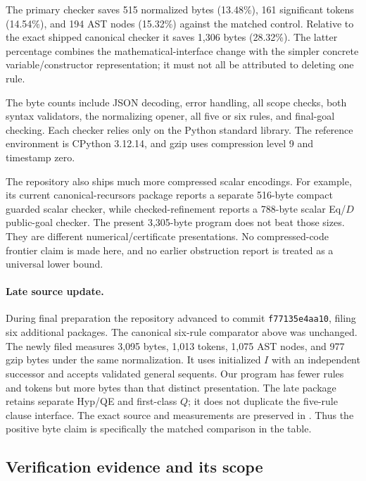

The primary checker saves 515 normalized bytes (13.48\%), 161 significant tokens (14.54\%), and 194 AST nodes (15.32\%) against the matched control. Relative to the exact shipped canonical checker it saves 1,306 bytes (28.32\%). The latter percentage combines the mathematical-interface change with the simpler concrete variable/constructor representation; it must not all be attributed to deleting one rule.

The byte counts include JSON decoding, error handling, all scope checks, both syntax validators, the normalizing opener, all five or six rules, and final-goal checking. Each checker relies only on the Python standard library. The reference environment is CPython 3.12.14, and gzip uses compression level 9 and timestamp zero.

The repository also ships much more compressed scalar encodings. For example, its current canonical-recursors package reports a separate 516-byte compact guarded scalar checker, while checked-refinement reports a 788-byte scalar Eq/$D$ public-goal checker. The present 3,305-byte program does not beat those sizes. They are different numerical/certificate presentations. No compressed-code frontier claim is made here, and no earlier obstruction report is treated as a universal lower bound.

\paragraph{Late source update.}
During final preparation the repository advanced to commit
\texttt{f77135e4aa10}, filing six additional packages. The canonical
six-rule comparator above was unchanged. The newly filed
 measures 3,095 bytes, 1,013 tokens,
1,075 AST nodes, and 977 gzip bytes under the same normalization. It uses
initialized $I$ with an independent successor and accepts validated
general sequents. Our program has fewer rules and tokens but more bytes
than that distinct presentation. The late package retains separate Hyp/QE
and first-class $Q$; it does not duplicate the five-rule clause interface.
The exact source and measurements are preserved in
. Thus the positive byte claim
is specifically the matched comparison in the table.

\subsection{Verification evidence and its scope}


